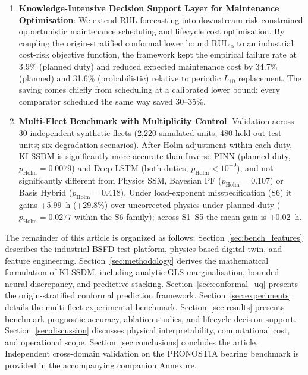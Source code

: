 \documentclass[a4paper,fleqn]{cas-dc}
\begin{document}
\begin{enumerate}[label=\textbf{C\arabic*.},leftmargin=2.5em]
    \item \textbf{Knowledge-Intensive Decision Support Layer for Maintenance Optimisation}: We extend RUL forecasting into downstream risk-constrained opportunistic maintenance scheduling and lifecycle cost optimisation. By coupling the origin-stratified conformal lower bound $\mathrm{RUL}_{\mathrm{lo}}$ to an industrial cost-risk objective function, the framework kept the empirical failure rate at 3.9\% (planned duty) and reduced expected maintenance cost by 34.7\% (planned) and 31.6\% (probabilistic) relative to periodic $L_{10}$ replacement. The saving comes chiefly from scheduling at a calibrated lower bound: every comparator scheduled the same way saved 30--35\%.
    \item \textbf{Multi-Fleet Benchmark with Multiplicity Control}: Validation across 30 independent synthetic fleets (2,220 simulated units; 480 held-out test units; six degradation scenarios). After Holm adjustment within each duty, KI-SSDM is significantly more accurate than Inverse PINN (planned duty, $p_{\mathrm{Holm}} = 0.0079$) and Deep LSTM (both duties, $p_{\mathrm{Holm}} < 10^{-9}$), and not significantly different from Physics SSM, Bayesian PF ($p_{\mathrm{Holm}} = 0.107$) or Basis Hybrid ($p_{\mathrm{Holm}} = 0.418$). Under load-exponent misspecification (S6) it gains +5.99~h (+29.8\%) over uncorrected physics under planned duty ($p_{\mathrm{Holm}} = 0.0277$ within the S6 family); across S1--S5 the mean gain is +0.02~h.\end{enumerate}

The remainder of this article is organized as follows: Section~\ref{sec:bench_features} describes the industrial BSFD test platform, physics-based digital twin, and feature engineering. Section~\ref{sec:methodology} derives the mathematical formulation of KI-SSDM, including analytic GLS marginalisation, bounded neural discrepancy, and predictive stacking. Section~\ref{sec:conformal_uq} presents the origin-stratified conformal prediction framework. Section~\ref{sec:experiments} details the multi-fleet experimental benchmark. Section~\ref{sec:results} presents benchmark prognostic accuracy, ablation studies, and lifecycle decision support. Section~\ref{sec:discussion} discusses physical interpretability, computational cost, and operational scope. Section~\ref{sec:conclusions} concludes the article. Independent cross-domain validation on the PRONOSTIA bearing benchmark is provided in the accompanying companion Annexure.

\end{document}
